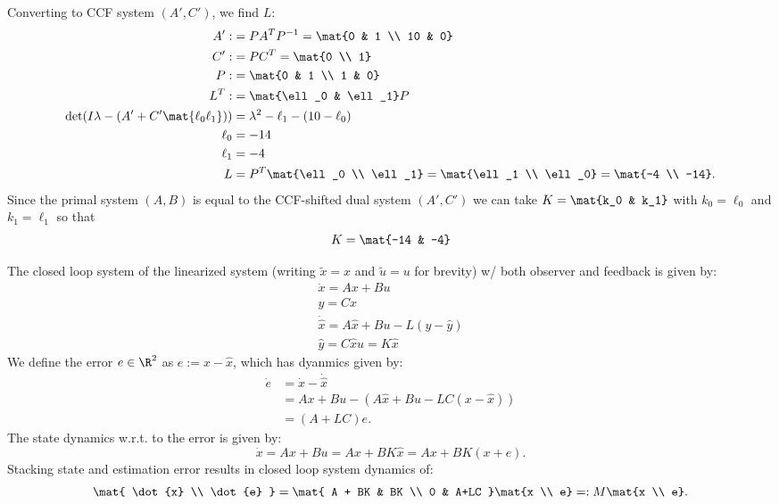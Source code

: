 \documentclass{homework}
\begin{document}
\begin{letterenum}
Converting to CCF system $(A', C')$, we find $L$:
\begin{align*}
    A' :&= PA^TP^{-1} = \mat{0 & 1 \\ 10 & 0} \\
    C' :&= PC^T = \mat{0 \\ 1} \\
    P :& = \mat{0 & 1 \\ 1 & 0} \\
    L^T :&= \mat{\ell_0 & \ell_1} P \\
    \det(I\lambda - (A' + C' \mat{\ell_0 \ell_1})) &= \lambda^2 - \ell_1 - (10 - \ell_0) \\
    \ell_0 &= -14 \\
    \ell_1 &= -4 \\
    L &= P^T \mat{\ell_0 \\ \ell_1} = \mat{\ell_1 \\ \ell_0} = \mat{-4 \\ -14}.
\end{align*}
Since the primal system $(A, B)$ is equal to the CCF-shifted dual system $(A', C')$
we can take $K = \mat{k_0 & k_1}$ with $k_0 = \ell_0$ and $k_1 = \ell_1$ so that
\begin{equation*}
    K = \mat{-14 & -4}
\end{equation*}

\item The closed loop system of the linearized system (writing $\tilde{x} = x$ and $\tilde{u} = u$ for brevity)
w/ both observer and feedback is given by:
\begin{align*}
    \dot{x} = Ax + Bu \\
    y = Cx \\
    \dot{\hat{x}} = A\hat{x} + Bu - L(y - \hat{y}) \\
    \hat{y} = C\hat{x}
    u = K\hat{x}
\end{align*}
We define the error $e\in\R^2$ as $e:=x - \hat{x}$, which has dyanmics given by:
\begin{align*}
    \dot{e} &= \dot{x} - \dot{\hat{x}} \\
        &= Ax + Bu - (A\hat{x} + Bu - LC(x - \hat{x})) \\
        &= (A + LC) e.
\end{align*}
The state dynamics w.r.t. to the error is given by:
\begin{equation*}
    \dot{x} = Ax + Bu = Ax + BK \hat{x} = Ax + BK(x + e).
\end{equation*}
Stacking state and estimation error results in closed loop system dynamics of:
\begin{equation*}
    \mat{
        \dot{x} \\ \dot{e}
    } = \mat{
        A + BK & BK \\
        0 & A+LC
    } \mat{x \\ e}
    =: M\mat{x \\ e}.
\end{equation*}


\end{letterenum}
\end{document}
